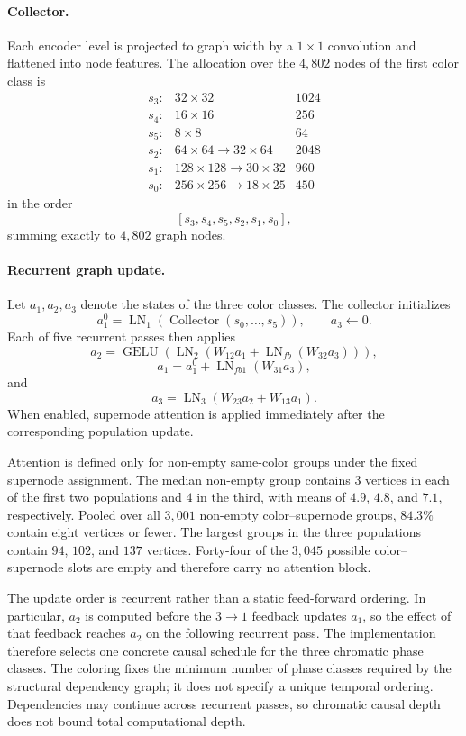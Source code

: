 \documentclass[12pt]{article}
\begin{document}
\paragraph{Collector.}
Each encoder level is projected to graph width by a \(1\times1\) convolution
and flattened into node features. The allocation over the \(4{,}802\) nodes
of the first color class is
\[
\begin{array}{llr}
s_3:&32\times32&1024\\
s_4:&16\times16&256\\
s_5:&8\times8&64\\
s_2:&64\times64\to32\times64&2048\\
s_1:&128\times128\to30\times32&960\\
s_0:&256\times256\to18\times25&450
\end{array}
\]
in the order
\[
[s_3,s_4,s_5,s_2,s_1,s_0],
\]
summing exactly to \(4{,}802\) graph nodes.


\paragraph{Recurrent graph update.}
Let \(a_1,a_2,a_3\) denote the states of the three color classes. The
collector initializes
\[
a_1^0
=
\operatorname{LN}_1
\!\left(
\operatorname{Collector}(s_0,\ldots,s_5)
\right),
\qquad
a_3\leftarrow0.
\]
Each of five recurrent passes then applies
\[
a_2
=
\operatorname{GELU}\!\left(
\operatorname{LN}_2\!\left(
W_{12}a_1+
\operatorname{LN}_{fb}(W_{32}a_3)
\right)
\right),
\]
\[
a_1
=
a_1^0+
\operatorname{LN}_{fb1}(W_{31}a_3),
\]
and
\[
a_3
=
\operatorname{LN}_3
\!\left(
W_{23}a_2+W_{13}a_1
\right).
\]
When enabled, supernode attention is applied immediately after the
corresponding population update.

Attention is defined only for non-empty same-color groups under the fixed
supernode assignment. The median non-empty group contains \(3\) vertices in
each of the first two populations and \(4\) in the third, with means of
\(4.9\), \(4.8\), and \(7.1\), respectively. Pooled over all \(3{,}001\)
non-empty color--supernode groups, \(84.3\%\) contain eight vertices or fewer.
The largest groups in the three populations contain \(94\), \(102\), and
\(137\) vertices. Forty-four of the \(3{,}045\) possible color--supernode
slots are empty and therefore carry no attention block.

The update order is recurrent rather than a static feed-forward ordering.
In particular, \(a_2\) is computed before the \(3\to1\) feedback updates
\(a_1\), so the effect of that feedback reaches \(a_2\) on the following
recurrent pass. The implementation therefore selects one concrete causal
schedule for the three chromatic phase classes. The coloring fixes the minimum
number of phase classes required by the structural dependency graph; it does
not specify a unique temporal ordering. Dependencies may continue across
recurrent passes, so chromatic causal depth does not bound total computational
depth.
\end{document}
